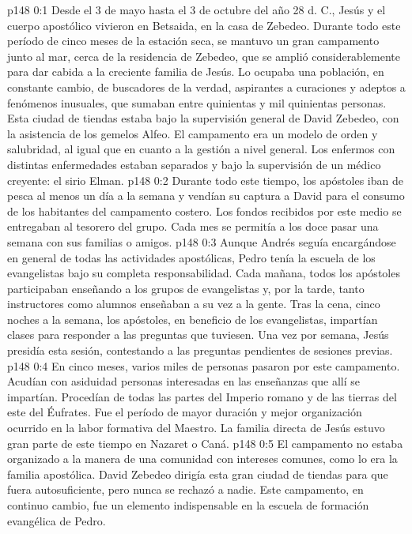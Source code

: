\author{Comisión de seres intermedios}
\vs p148 0:1 Desde el 3 de mayo hasta el 3 de octubre del año 28 d. C., Jesús y el cuerpo apostólico vivieron en Betsaida, en la casa de Zebedeo. Durante todo este período de cinco meses de la estación seca, se mantuvo un gran campamento junto al mar, cerca de la residencia de Zebedeo, que se amplió considerablemente para dar cabida a la creciente familia de Jesús. Lo ocupaba una población, en constante cambio, de buscadores de la verdad, aspirantes a curaciones y adeptos a fenómenos inusuales, que sumaban entre quinientas y mil quinientas personas. Esta ciudad de tiendas estaba bajo la supervisión general de David Zebedeo, con la asistencia de los gemelos Alfeo. El campamento era un modelo de orden y salubridad, al igual que en cuanto a la gestión a nivel general. Los enfermos con distintas enfermedades estaban separados y bajo la supervisión de un médico creyente: el sirio Elman.
\vs p148 0:2 Durante todo este tiempo, los apóstoles iban de pesca al menos un día a la semana y vendían su captura a David para el consumo de los habitantes del campamento costero. Los fondos recibidos por este medio se entregaban al tesorero del grupo. Cada mes se permitía a los doce pasar una semana con sus familias o amigos.
\vs p148 0:3 Aunque Andrés seguía encargándose en general de todas las actividades apostólicas, Pedro tenía la escuela de los evangelistas bajo su completa responsabilidad. Cada mañana, todos los apóstoles participaban enseñando a los grupos de evangelistas y, por la tarde, tanto instructores como alumnos enseñaban a su vez a la gente. Tras la cena, cinco noches a la semana, los apóstoles, en beneficio de los evangelistas, impartían clases para responder a las preguntas que tuviesen. Una vez por semana, Jesús presidía esta sesión, contestando a las preguntas pendientes de sesiones previas.
\vs p148 0:4 En cinco meses, varios miles de personas pasaron por este campamento. Acudían con asiduidad personas interesadas en las enseñanzas que allí se impartían. Procedían de todas las partes del Imperio romano y de las tierras del este del Éufrates. Fue el período de mayor duración y mejor organización ocurrido en la labor formativa del Maestro. La familia directa de Jesús estuvo gran parte de este tiempo en Nazaret o Caná.
\vs p148 0:5 El campamento no estaba organizado a la manera de una comunidad con intereses comunes, como lo era la familia apostólica. David Zebedeo dirigía esta gran ciudad de tiendas para que fuera autosuficiente, pero nunca se rechazó a nadie. Este campamento, en continuo cambio, fue un elemento indispensable en la escuela de formación evangélica de Pedro.
